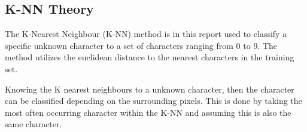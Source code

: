 \subsection{K-NN Theory}
The K-Nearest Neighbour (K-NN) method is in this report used to classify a specific unknown character to a set of characters ranging from 0 to 9.
The method utilizes the euclidean distance to the nearest characters in the training set.

Knowing the K nearest neighbours to a unknown character, then the character can be classified depending on the surrounding pixels.
This is done by taking the most often occurring character within the K-NN and assuming this is also the same character.

